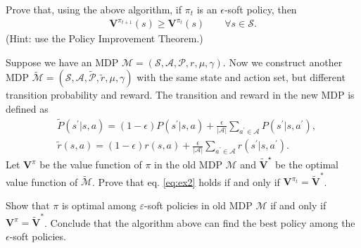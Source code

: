 \vspace{.2cm}
\begin{questions}
    \question[10] Prove that, using the above algorithm, if $\pi_t$ is an $\epsilon$-soft policy, then
    \begin{align}
    \label{eq:ex2}
	    \mathbf{V}^{\pi_{t+1}}(s) \geq \mathbf{V}^{\pi_t}(s) \quad \quad \forall s \in \mathcal{S}.
    \end{align}
    (Hint: use the Policy Improvement Theorem.)
 
	\question[5] Suppose we have an MDP $\mathcal{M} = (\mathcal{S}, \mathcal{A},\mathcal{P}, r, \mu, \gamma)$. Now we construct another MDP $\widetilde{\mathcal{M}} = (\mathcal{S}, \mathcal{A}, \widetilde{\mathcal{P}}, \widetilde{r}, \mu, \gamma)$ with the same state and action set, but different transition probability and reward. The transition and reward in the new MDP is defined as 
	\begin{align*}
	    &\widetilde{P}(s^\prime | s, a) = (1-\epsilon)P(s^\prime | s, a)  + \frac{\epsilon}{|\mathcal{A}|} \sum_{a^\prime\in \mathcal{A}} P(s^\prime | s, a^\prime), \\
	    &\widetilde{r}(s, a) = (1-\epsilon)r( s, a)  + \frac{\epsilon}{|\mathcal{A}|} \sum_{a^\prime\in \mathcal{A}} r(s^\prime | s, a^\prime).
	\end{align*}
	Let $\boldsymbol{V}^\pi$ be the value function of $\pi$ in the old MDP $\mathcal{M}$ and $\boldsymbol{\widetilde{V}}^\star$ be the optimal value function of $\widetilde{\mathcal{M}}$.  Prove that eq. \ref{eq:ex2} holds if and only if  $\boldsymbol{V}^{\pi_t} = \boldsymbol{\widetilde{V}}^*$.
	
	
	\question[5] 	Show that $\pi$ is optimal among $\varepsilon$-soft policies in old MDP $\mathcal{M}$ if and only if $\boldsymbol{V}^\pi = \boldsymbol{\widetilde{V}}^*$. Conclude that the algorithm above can find the best policy among the $\epsilon$-soft policies. 
	

	
\end{questions}

